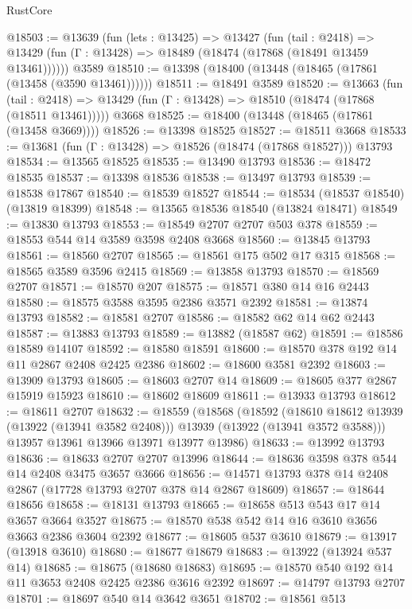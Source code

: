 \begin{lexlean}{RustCore}
\begin{coremodule}
@18503 := @13639
    (fun (lets : @13425) =>
    @13427
      (fun (tail : @2418) =>
      @13429 (fun (Γ : @13428) => @18489 (@18474 (@17868 (@18491 @13459 @13461))))))
    @3589
@18510 := @13398 (@18400 (@13448 (@18465 (@17861 (@13458 (@3590 @13461))))))
@18511 := @18491 @3589
@18520 := @13663
    (fun (tail : @2418) => @13429 (fun (Γ : @13428) => @18510 (@18474 (@17868 (@18511 @13461)))))
    @3668
@18525 := @18400 (@13448 (@18465 (@17861 (@13458 @3669))))
@18526 := @13398 @18525
@18527 := @18511 @3668
@18533 := @13681 (fun (Γ : @13428) => @18526 (@18474 (@17868 @18527))) @13793
@18534 := @13565 @18525
@18535 := @13490 @13793
@18536 := @18472 @18535
@18537 := @13398 @18536
@18538 := @13497 @13793
@18539 := @18538 @17867
@18540 := @18539 @18527
@18544 := @18534 (@18537 @18540) (@13819 @18399)
@18548 := @13565 @18536 @18540 (@13824 @18471)
@18549 := @13830 @13793
@18553 := @18549 @2707 @2707 @503 @378
@18559 := @18553 @544 @14 @3589 @3598 @2408 @3668
@18560 := @13845 @13793
@18561 := @18560 @2707
@18565 := @18561 @175 @502 @17 @315
@18568 := @18565 @3589 @3596 @2415
@18569 := @13858 @13793
@18570 := @18569 @2707
@18571 := @18570 @207
@18575 := @18571 @380 @14 @16 @2443
@18580 := @18575 @3588 @3595 @2386 @3571 @2392
@18581 := @13874 @13793
@18582 := @18581 @2707
@18586 := @18582 @62 @14 @62 @2443
@18587 := @13883 @13793
@18589 := @13882 (@18587 @62)
@18591 := @18586 @18589 @14107
@18592 := @18580 @18591
@18600 := @18570 @378 @192 @14 @11 @2867 @2408 @2425 @2386
@18602 := @18600 @3581 @2392
@18603 := @13909 @13793
@18605 := @18603 @2707 @14
@18609 := @18605 @377 @2867 @15919 @15923
@18610 := @18602 @18609
@18611 := @13933 @13793
@18612 := @18611 @2707
@18632 := @18559
    (@18568
      (@18592
        (@18610 @18612 @13939 (@13922 (@13941 @3582 @2408)))
        @13939
        (@13922 (@13941 @3572 @3588)))
      @13957
      @13961
      @13966
      @13971
      @13977
      @13986)
@18633 := @13992 @13793
@18636 := @18633 @2707 @2707 @13996
@18644 := @18636 @3598 @378 @544 @14 @2408 @3475 @3657 @3666
@18656 := @14571 @13793 @378 @14 @2408 @2867 (@17728 @13793 @2707 @378 @14 @2867 @18609)
@18657 := @18644 @18656
@18658 := @18131 @13793
@18665 := @18658 @513 @543 @17 @14 @3657 @3664 @3527
@18675 := @18570 @538 @542 @14 @16 @3610 @3656 @3663 @2386 @3604 @2392
@18677 := @18605 @537 @3610
@18679 := @13917 (@13918 @3610)
@18680 := @18677 @18679
@18683 := @13922 (@13924 @537 @14)
@18685 := @18675 (@18680 @18683)
@18695 := @18570 @540 @192 @14 @11 @3653 @2408 @2425 @2386 @3616 @2392
@18697 := @14797 @13793 @2707
@18701 := @18697 @540 @14 @3642 @3651
@18702 := @18561 @513

\end{coremodule}
\end{lexlean}
